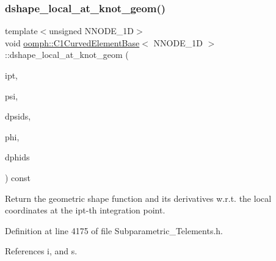 \subsubsection{\texorpdfstring{dshape\+\_\+local\+\_\+at\+\_\+knot\+\_\+geom()}{dshape\_local\_at\_knot\_geom()}}
{\footnotesize\ttfamily template$<$unsigned N\+N\+O\+D\+E\+\_\+1D$>$ \\
void \hyperlink{classoomph_1_1C1CurvedElementBase}{oomph\+::\+C1\+Curved\+Element\+Base}$<$ N\+N\+O\+D\+E\+\_\+1D $>$\+::dshape\+\_\+local\+\_\+at\+\_\+knot\+\_\+geom (\begin{DoxyParamCaption}\item[{const unsigned \&}]{ipt,  }\item[{\hyperlink{classoomph_1_1Shape}{Shape} \&}]{psi,  }\item[{\hyperlink{classoomph_1_1DShape}{D\+Shape} \&}]{dpsids,  }\item[{\hyperlink{classoomph_1_1Shape}{Shape} \&}]{phi,  }\item[{\hyperlink{classoomph_1_1DShape}{D\+Shape} \&}]{dphids }\end{DoxyParamCaption}) const\hspace{0.3cm}{\ttfamily [inline]}}



Return the geometric shape function and its derivatives w.\+r.\+t. the local coordinates at the ipt-\/th integration point. 



Definition at line 4175 of file Subparametric\+\_\+\+Telements.\+h.



References i, and s.

\mbox{\label{classoomph_1_1C1CurvedElementBase_a73eff2b9d4873234465778f53bbeaec8}} 
